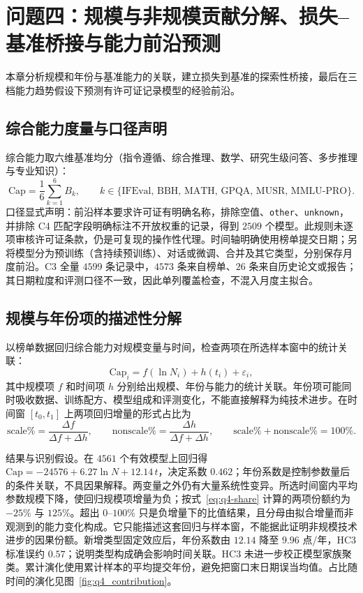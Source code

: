 \section{问题四：规模与非规模贡献分解、损失--基准桥接与能力前沿预测}

本章分析规模和年份与基准能力的关联，建立损失到基准的探索性桥接，最后在三档能力趋势假设下预测有许可证记录模型的经验前沿。

\subsection{综合能力度量与口径声明}
综合能力取六维基准均分（指令遵循、综合推理、数学、研究生级问答、多步推理与专业知识）：
\begin{equation}
\mathrm{Cap}=\frac{1}{6}\sum_{k=1}^{6} B_k,\qquad k\in\{\text{IFEval, BBH, MATH, GPQA, MUSR, MMLU-PRO}\}.
\label{eq:q4-cap}
\end{equation}
口径显式声明：前沿样本要求许可证有明确名称，排除空值、\texttt{other}、\texttt{unknown}，并排除 C4 匹配字段明确标注不开放权重的记录，得到 $2509$ 个模型。此规则未逐项审核许可证条款，仍是可复现的操作性代理。时间轴明确使用榜单提交日期；另将模型分为预训练（含持续预训练）、对话或微调、合并及其它类型，分别保存月度前沿。C3 全量 $4599$ 条记录中，$4573$ 条来自榜单、$26$ 条来自历史论文或报告；其日期粒度和评测口径不一致，因此单列覆盖检查，不混入月度主拟合。

\subsection{规模与年份项的描述性分解}
以榜单数据回归综合能力对规模变量与时间，检查两项在所选样本窗中的统计关联：
\begin{equation}
\mathrm{Cap}_i=f(\ln N_i)+h(t_i)+\varepsilon_i,
\label{eq:q4-decomp}
\end{equation}
其中规模项 $f$ 和时间项 $h$ 分别给出规模、年份与能力的统计关联。年份项可能同时吸收数据、训练配方、模型组成和评测变化，不能直接解释为纯技术进步。在时间窗 $[t_0,t_1]$ 上两项回归增量的形式占比为
\begin{equation}
\text{scale\%}=\frac{\Delta f}{\Delta f+\Delta h},\qquad
\text{nonscale\%}=\frac{\Delta h}{\Delta f+\Delta h},\qquad
\text{scale\%}+\text{nonscale\%}=100\% .
\label{eq:q4-share}
\end{equation}

结果与识别假设。在 $4561$ 个有效模型上回归得 $\mathrm{Cap}=-24576+6.27\ln N+12.14\,t$，决定系数 $0.462$；年份系数是控制参数量后的条件关联，不具因果解释。两变量之外仍有大量系统性变异。所选时间窗内平均参数规模下降，使回归规模项增量为负；按式~\eqref{eq:q4-share} 计算的两项份额约为 $-25\%$ 与 $125\%$。超出 $0$--$100\%$ 只是负增量下的比值结果，且分母由拟合增量而非观测到的能力变化构成。它只能描述这套回归与样本窗，不能据此证明非规模技术进步的因果份额。新增类型固定效应后，年份系数由 $12.14$ 降至 $9.96$ 点/年，HC3 标准误约 $0.57$；说明类型构成确会影响时间关联。HC3 未进一步校正模型家族聚类。累计演化使用累计样本的平均提交年份，避免把窗口末日期误当均值。占比随时间的演化见图~\ref{fig:q4_contribution}。

